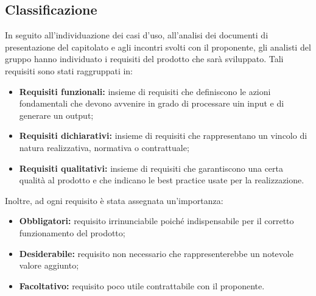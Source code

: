 \subsection{Classificazione}
In seguito all'individuazione dei casi d'uso, all'analisi dei documenti di presentazione del capitolato e agli incontri svolti con il proponente, gli analisti del gruppo \Gruppo{} hanno individuato i requisiti del prodotto che sar\`{a} sviluppato. Tali requisiti sono stati raggruppati in:

\begin{itemize}
    \item \textbf{Requisiti funzionali:} insieme di requisiti che definiscono le azioni fondamentali che devono avvenire in grado di processare uin input e di generare un output;
    \item  \textbf{Requisiti dichiarativi:} insieme di requisiti che rappresentano un vincolo di natura realizzativa, normativa o contrattuale;
    \item \textbf{Requisiti qualitativi:} insieme di requisiti che garantiscono una certa qualit\`{a} al prodotto e che indicano le best practice usate per la realizzazione.
\end{itemize}

Inoltre, ad ogni requisito \`{e} stata assegnata un'importanza:

\begin{itemize}
    \item \textbf{Obbligatori:} requisito irrinunciabile poich\'{e} indispensabile per il corretto funzionamento del prodotto;
    \item \textbf{Desiderabile:} requisito non necessario che rappresenterebbe un notevole valore aggiunto;
    \item \textbf{Facoltativo:} requisito poco utile contrattabile con il proponente.
\end{itemize}



